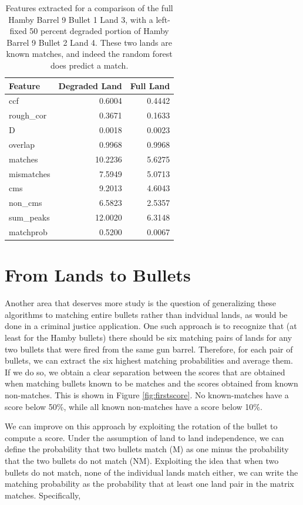 \documentclass[12pt,]{article}
\theoremstyle{definition}
\theoremstyle{definition}
\theoremstyle{definition}
\theoremstyle{remark}
\begin{document}
\begin{table}[ht]
\centering
\begin{tabular}{lrr}
  \hline
Feature & Degraded Land & Full Land \\ 
  \hline
ccf & 0.6004 & 0.4442 \\ 
  rough\_cor & 0.3671 & 0.1633 \\ 
  D & 0.0018 & 0.0023 \\ 
  overlap & 0.9968 & 0.9968 \\ 
  matches & 10.2236 & 5.6275 \\ 
  mismatches & 7.5949 & 5.0713 \\ 
  cms & 9.2013 & 4.6043 \\ 
  non\_cms & 6.5823 & 2.5357 \\ 
  sum\_peaks & 12.0020 & 6.3148 \\ 
  matchprob & 0.5200 & 0.0067 \\ 
   \hline
\end{tabular}
\caption{Features extracted for a comparison of the full Hamby Barrel 9 Bullet 1 Land 3, with a left-fixed 50 percent degraded portion of Hamby Barrel 9 Bullet 2 Land 4. These two lands are known matches, and indeed the random forest does predict a match.} 
\label{tab:br924pred}
\end{table}


\section{From Lands to Bullets}\label{from-lands-to-bullets}

Another area that deserves more study is the question of generalizing
these algorithms to matching entire bullets rather than indvidual lands,
as would be done in a criminal justice application. One such approach is
to recognize that (at least for the Hamby bullets) there should be six
matching pairs of lands for any two bullets that were fired from the
same gun barrel. Therefore, for each pair of bullets, we can extract the
six highest matching probabilities and average them. If we do so, we
obtain a clear separation between the scores that are obtained when
matching bullets known to be matches and the scores obtained from known
non-matches. This is shown in Figure \ref{fig:firstscore}. No
known-matches have a score below 50\%, while all known non-matches have
a score below 10\%.

We can improve on this approach by exploiting the rotation of the bullet
to compute a score. Under the assumption of land to land independence,
we can define the probability that two bullets match (M) as one minus
the probability that the two bullets do not match (NM). Exploiting the
idea that when two bullets do not match, none of the individual lands
match either, we can write the matching probability as the probability
that at least one land pair in the matrix matches. Specifically,
\end{document}
